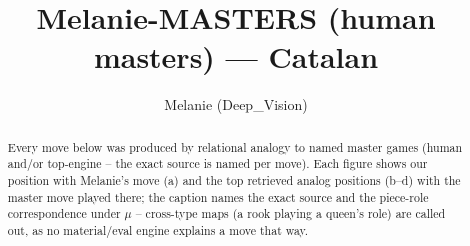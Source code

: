 \documentclass[11pt]{article}
\title{Melanie-MASTERS (human masters) — Catalan}
\author{Melanie (Deep\_Vision)}
\date{}
\begin{document}
\maketitle

\begin{abstract}Every move below was produced by relational analogy to named master games (human and/or top-engine -- the exact source is named per move). Each figure shows our position with Melanie's move (a) and the top retrieved analog positions (b--d) with the master move played there; the caption names the exact source and the piece-role correspondence under $\mu$ -- cross-type maps (a rook playing a queen's role) are called out, as no material/eval engine explains a move that way.\end{abstract}

\begin{figure}[p]\centering
\begin{subfigure}{0.46\textwidth}\centering
\resizebox{\linewidth}{!}{%
\newchessgame
\chessboard[
  setfen={rnbq1rk1/ppp1bppp/4pn2/4N3/2pP4/6P1/PP2PPBP/RNBQ1RK1 b - - 1 7},
  showmover=false,
  pgfstyle=straightmove, color=movearrow, markmove={c7-c6}
]}
\caption{}
\end{subfigure}\hfill
\begin{subfigure}{0.46\textwidth}\centering
\resizebox{\linewidth}{!}{%
\newchessgame
\chessboard[
  setfen={r1bq1rk1/1p2bppp/p3pn2/4N3/PnBP4/2N5/1P3PPP/R1BQR1K1 b - - 4 12},
  showmover=false,
  pgfstyle=straightmove, color=movearrow, markmove={c8-d7}
]}
\caption{}
\end{subfigure}
\\[4pt]
\begin{subfigure}{0.46\textwidth}\centering
\resizebox{\linewidth}{!}{%
\newchessgame
\chessboard[
  setfen={r2qbrk1/pp2bppp/1np1p3/4N3/3P4/6P1/PPP1QPBP/R1BR2K1 b - - 9 14},
  showmover=false,
  pgfstyle=straightmove, color=movearrow, markmove={b6-d7}
]}
\caption{}
\end{subfigure}\hfill
\begin{subfigure}{0.46\textwidth}\centering
\resizebox{\linewidth}{!}{%
\newchessgame
\chessboard[
  setfen={rnbq1rk1/1p2bppp/p4n2/4p3/2Pp4/1P4P1/PBN1PPBP/RN1Q1RK1 b - - 3 12},
  showmover=false,
  pgfstyle=straightmove, color=movearrow, markmove={b8-c6}
]}
\caption{}
\end{subfigure}

\end{figure}
\end{document}

